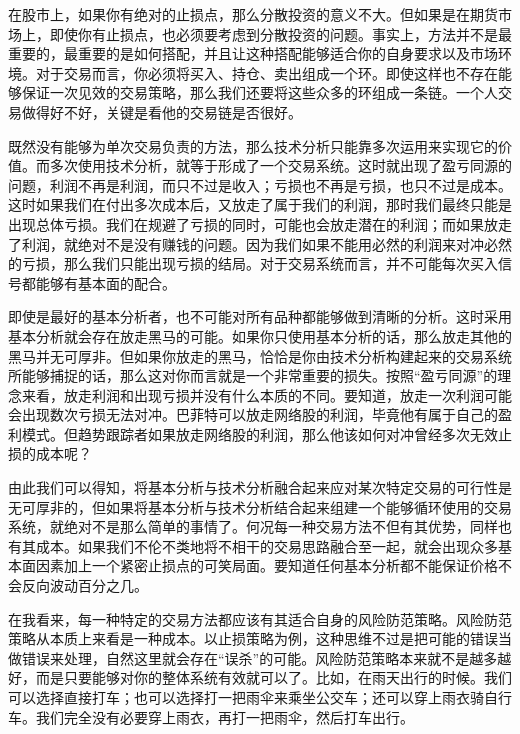 在股市上，如果你有绝对的止损点，那么分散投资的意义不大。但如果是在期货市场上，即使你有止损点，也必须要考虑到分散投资的问题。事实上，方法并不是最重要的，最重要的是如何搭配，并且让这种搭配能够适合你的自身要求以及市场环境。对于交易而言，你必须将买入、持仓、卖出组成一个环。即使这样也不存在能够保证一次见效的交易策略，那么我们还要将这些众多的环组成一条链。一个人交易做得好不好，关键是看他的交易链是否很好。

既然没有能够为单次交易负责的方法，那么技术分析只能靠多次运用来实现它的价值。而多次使用技术分析，就等于形成了一个交易系统。这时就出现了盈亏同源的问题，利润不再是利润，而只不过是收入；亏损也不再是亏损，也只不过是成本。这时如果我们在付出多次成本后，又放走了属于我们的利润，那时我们最终只能是出现总体亏损。我们在规避了亏损的同时，可能也会放走潜在的利润；而如果放走了利润，就绝对不是没有赚钱的问题。因为我们如果不能用必然的利润来对冲必然的亏损，那么我们只能出现亏损的结局。对于交易系统而言，并不可能每次买入信号都能够有基本面的配合。

即使是最好的基本分析者，也不可能对所有品种都能够做到清晰的分析。这时采用基本分析就会存在放走黑马的可能。如果你只使用基本分析的话，那么放走其他的黑马并无可厚非。但如果你放走的黑马，恰恰是你由技术分析构建起来的交易系统所能够捕捉的话，那么这对你而言就是一个非常重要的损失。按照“盈亏同源”的理念来看，放走利润和出现亏损并没有什么本质的不同。要知道，放走一次利润可能会出现数次亏损无法对冲。巴菲特可以放走网络股的利润，毕竟他有属于自己的盈利模式。但趋势跟踪者如果放走网络股的利润，那么他该如何对冲曾经多次无效止损的成本呢？

由此我们可以得知，将基本分析与技术分析融合起来应对某次特定交易的可行性是无可厚非的，但如果将基本分析与技术分析结合起来组建一个能够循环使用的交易系统，就绝对不是那么简单的事情了。何况每一种交易方法不但有其优势，同样也有其成本。如果我们不伦不类地将不相干的交易思路融合至一起，就会出现众多基本面因素加上一个紧密止损点的可笑局面。要知道任何基本分析都不能保证价格不会反向波动百分之几。

在我看来，每一种特定的交易方法都应该有其适合自身的风险防范策略。风险防范策略从本质上来看是一种成本。以止损策略为例，这种思维不过是把可能的错误当做错误来处理，自然这里就会存在“误杀”的可能。风险防范策略本来就不是越多越好，而是只要能够对你的整体系统有效就可以了。比如，在雨天出行的时候。我们可以选择直接打车；也可以选择打一把雨伞来乘坐公交车；还可以穿上雨衣骑自行车。我们完全没有必要穿上雨衣，再打一把雨伞，然后打车出行。

